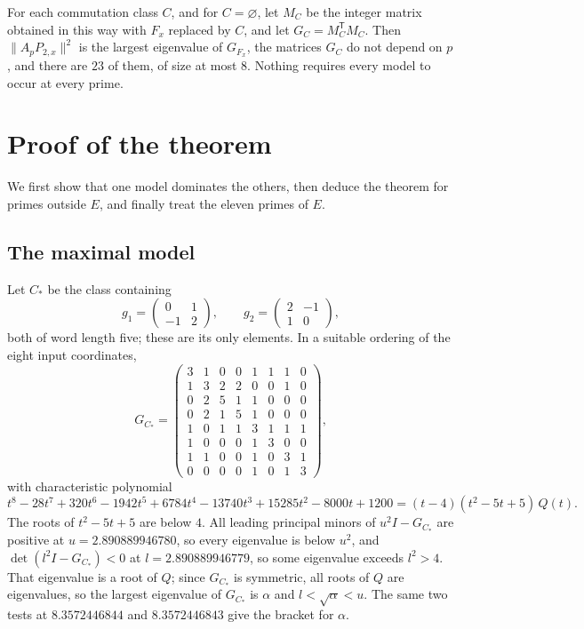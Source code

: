\documentclass[11pt,a4paper]{article}
\numberwithin{equation}{section}
\theoremstyle{remark}
\begin{document}
For each commutation class $C$, and for $C=\varnothing$, let $M_C$ be the integer matrix obtained in this way with $F_x$ replaced by $C$, and let $G_C=M_C^{\mathsf T}M_C$. Then $\|A_pP_{2,x}\|^2$ is the largest eigenvalue of $G_{F_x}$, the matrices $G_C$ do not depend on $p$, and there are $23$ of them, of size at most $8$. Nothing requires every model to occur at every prime.

\section{Proof of the theorem}\label{sec:proof}

We first show that one model dominates the others, then deduce the theorem for primes outside $E$, and finally treat the eleven primes of $E$.

\subsection{The maximal model}

Let $C_*$ be the class containing
\[
g_1=\begin{pmatrix}0&1\\-1&2\end{pmatrix},\qquad g_2=\begin{pmatrix}2&-1\\1&0\end{pmatrix},
\]
both of word length five; these are its only elements. In a suitable ordering of the eight input coordinates,
\[
G_{C_*}=\begin{pmatrix}
3&1&0&0&1&1&1&0\\
1&3&2&2&0&0&1&0\\
0&2&5&1&1&0&0&0\\
0&2&1&5&1&0&0&0\\
1&0&1&1&3&1&1&1\\
1&0&0&0&1&3&0&0\\
1&1&0&0&1&0&3&1\\
0&0&0&0&1&0&1&3
\end{pmatrix},
\]
with characteristic polynomial
\[
t^8-28t^7+320t^6-1942t^5+6784t^4-13740t^3+15285t^2-8000t+1200=(t-4)(t^2-5t+5)\,Q(t).
\]
The roots of $t^2-5t+5$ are below $4$. All leading principal minors of $u^2I-G_{C_*}$ are positive at $u=2.890889946780$, so every eigenvalue is below $u^2$, and $\det(l^2I-G_{C_*})<0$ at $l=2.890889946779$, so some eigenvalue exceeds $l^2>4$. That eigenvalue is a root of $Q$; since $G_{C_*}$ is symmetric, all roots of $Q$ are eigenvalues, so the largest eigenvalue of $G_{C_*}$ is $\alpha$ and $l<\sqrt\alpha<u$. The same two tests at $8.3572446844$ and $8.3572446843$ give the bracket for $\alpha$.
\end{document}
